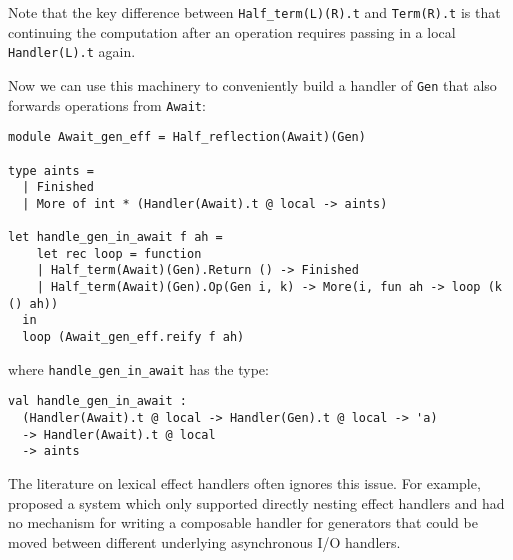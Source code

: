 \documentclass[acmsmall, screen, nonacm]{acmart}
\theoremstyle{definition}
\begin{document}
Note that the key difference between
\lstinline[style=oxcaml]{Half_term(L)(R).t} and
\lstinline[style=oxcaml]{Term(R).t} is that continuing the computation
after an operation requires passing in a local
\lstinline[style=oxcaml]{Handler(L).t} again.

%
%

Now we can use this machinery to conveniently build a handler of
\lstinline[style=oxcaml]{Gen} that also forwards operations from
\lstinline[style=oxcaml]{Await}:
\begin{lstlisting}[style=oxcaml]
module Await_gen_eff = Half_reflection(Await)(Gen)

type aints =
  | Finished
  | More of int * (Handler(Await).t @ local -> aints)

let handle_gen_in_await f ah =
    let rec loop = function
    | Half_term(Await)(Gen).Return () -> Finished
    | Half_term(Await)(Gen).Op(Gen i, k) -> More(i, fun ah -> loop (k () ah))
  in
  loop (Await_gen_eff.reify f ah)
\end{lstlisting}
where \lstinline[style=oxcaml]{handle_gen_in_await} has the type:
\begin{lstlisting}[style=oxcaml]
val handle_gen_in_await :
  (Handler(Await).t @ local -> Handler(Gen).t @ local -> 'a)
  -> Handler(Await).t @ local
  -> aints
\end{lstlisting}

The literature on lexical effect handlers often ignores this issue. For
example, \cite{??} proposed a system which only supported directly
nesting effect handlers and had no mechanism for writing a composable
handler for generators that could be moved between different underlying
asynchronous I/O handlers.
\end{document}
